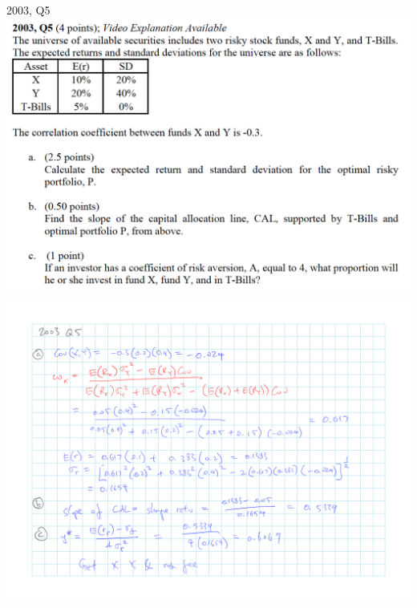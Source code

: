\documentclass[]{book}
\theoremstyle{definition}
\theoremstyle{definition}
\theoremstyle{remark}
\begin{document}
 2003, Q5 \includegraphics{questions/2003-5Q.png}
\includegraphics{questions/2003-5A.png}
\end{document}
